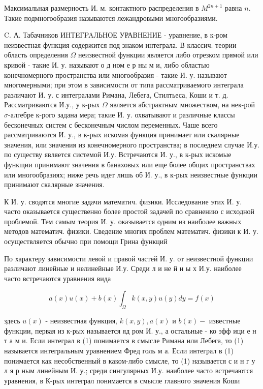 \documentclass[10pt]{article}
\begin{document}
Максимальная размерность И. м. контактного распределения в $M^{2 n+1}$ равна $n$. Такие подмногообразия называются лежандровыми многообразиями.



C. А. Табачников ИHТEГPAЛЬНОЕ УРАВНЕНИЕ - уравнение, в к-ром неизвестная функция содержится под знаком интеграла. В классич. теории область определения $\Omega$ неизвестной функции является либо отрезком прямой или кривой - такие И. у. называют о д ном е р ны м и, либо областью конечномерного пространства или многообразия - такие И. у. называют многомерными; при этом в зависимости от типа рассматриваемого интеграла различают И. у. с интегралами Римана, Лебега, Стилтьеса, Коши и т. д. Рассматриваются И.у., у к-рых $\Omega$ является абстрактным множеством, на нек-рой $\sigma$-алгебре к-рого задана мера; такие И. у. охватывают и различные классы бесконечных систем с бесконечным числом переменных. Чаше всего рассматриваются И. у., в к-рых искомая функция принимает или скалярные значения, или значения из конечномерного пространства; в последнем случае И.у. по существу является системой И.у. Встречаются И. у., в к-рых искомые функщии принимают значения в банаховых или еще более общих пространствах или многообразиях; ниже речь идет лишь об И. у., в к-рых неизвестные функции принимают скалярные значения.



К И. у. сводятся многие задачи математич. физики. Исследование этих И. у. часто оказывается существенно более простой задачей по сравнению с исходной проблемой. Тем самым теория И. у. оказывается одним из наиболее важных методов математич. физики. Сведение многих проблем математич. физики к И. у. осуществляется обычно при помощи Грина функций



По характеру зависимости левой и правой частей И. у. от неизвестной функции различают линейные и нелинейные И.у. Среди л и не й н ы х И.у. наиболее часто встречаются уравнения вида



\[

a(x) u(x)+b(x) \int_{\Omega} k(x, y) u(y) d y=f(x)

\]



здесь $u(x)$ - неизвестная функция, $k(x, y), a(x)$ и $b(x)-$ известные функции, первая из к-рых называется яд ром И. у., а остальные - ко эфф ици е н т а м и. Если интеграл в (1) понимается в смысле Римана или Лебега, то (1) называется интегральным уравнением Фред голь м а. Если интеграл в (1) понимается как несобственный в каком-либо смысле, то (1) называется с и н г у л я р ным линейным И. у.; среди сингулярных И.у. наиболее часто встречаются уравнения, в К-рых интеграл понимается в смысле главного значения Коши
\end{document}
